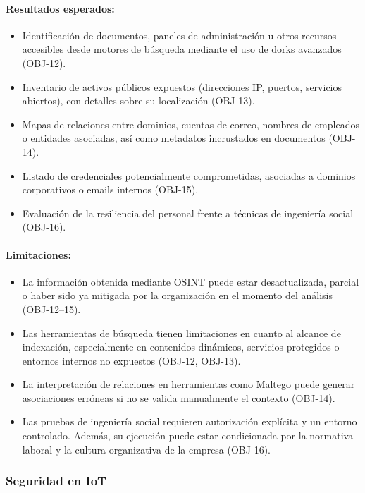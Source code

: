 \documentclass[a4paper, 10pt]{article}
\begin{document}
\paragraph{Resultados esperados:}
\begin{itemize}
    \item Identificación de documentos, paneles de administración u otros recursos accesibles desde motores de búsqueda mediante el uso de dorks avanzados (OBJ-12).
    \item Inventario de activos públicos expuestos (direcciones IP, puertos, servicios abiertos), con detalles sobre su localización (OBJ-13).
    \item Mapas de relaciones entre dominios, cuentas de correo, nombres de empleados o entidades asociadas, así como metadatos incrustados en documentos (OBJ-14).
    \item Listado de credenciales potencialmente comprometidas, asociadas a dominios corporativos o emails internos (OBJ-15).
    \item Evaluación de la resiliencia del personal frente a técnicas de ingeniería social (OBJ-16).
\end{itemize}

\paragraph{Limitaciones:}
\begin{itemize}
    \item La información obtenida mediante OSINT puede estar desactualizada, parcial o haber sido ya mitigada por la organización en el momento del análisis (OBJ-12–15).
    \item Las herramientas de búsqueda tienen limitaciones en cuanto al alcance de indexación, especialmente en contenidos dinámicos, servicios protegidos o entornos internos no expuestos (OBJ-12, OBJ-13).
    \item La interpretación de relaciones en herramientas como Maltego puede generar asociaciones erróneas si no se valida manualmente el contexto (OBJ-14).
    \item Las pruebas de ingeniería social requieren autorización explícita y un entorno controlado. Además, su ejecución puede estar condicionada por la normativa laboral y la cultura organizativa de la empresa (OBJ-16).
\end{itemize}

\subsubsection{Seguridad en IoT}
\end{document}
